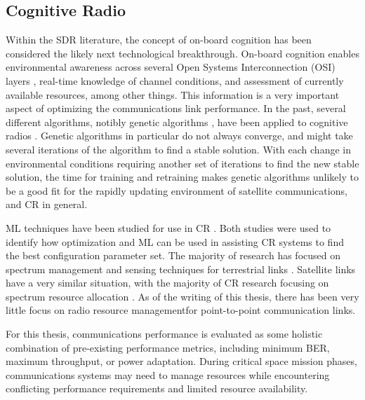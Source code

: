 \subsection{Cognitive Radio}
\par Within the SDR literature, the concept of on-board cognition has been considered the likely next technological breakthrough.  On-board cognition enables environmental awareness across several Open Systems Interconnection (OSI) layers \cite{paulo39}, real-time knowledge of channel conditions, and assessment of currently available resources, among other things. This information is a very important aspect of optimizing the communications link performance. In the past, several different algorithms, notibly genetic algorithms \cite{paulo40}, have been applied to cognitive radios \cite{paulo41}. Genetic algorithms in particular do not always converge, and might take several iterations of the algorithm to find a stable solution. With each change in environmental conditions requiring another set of iterations to find the new stable solution, the time for training and retraining makes genetic algorithms unlikely to be a good fit for the rapidly updating environment of satellite communications, and CR in general.
\par ML techniques have been studied for use in CR \cite{paulo42,paulo45}. Both studies were used to identify how optimization and ML can be used in assisting CR systems to find the best configuration parameter set. The majority of research has focused on spectrum management and sensing techniques for terrestrial links \cite{paulo45,paulo47}. Satellite links have a very similar situation, with the majority of CR research focusing on spectrum resource allocation \cite{paulo48,paulo50}. As of the writing of this thesis, there has been very little focus on radio resource managementfor point-to-point communication links.
\par For this thesis, communications performance is evaluated as some holistic combination of pre-existing performance metrics, including minimum BER, maximum throughput, or power adaptation. During critical space mission phases, communications systems may need to manage resources while encountering conflicting performance requirements and limited resource availability. 
